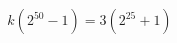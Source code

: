 \documentclass[preview]{standalone}
\begin{document}
\begin{align*}
k (2^{50} - 1) = 3(2^{25} + 1)
\end{align*}
\end{document}
